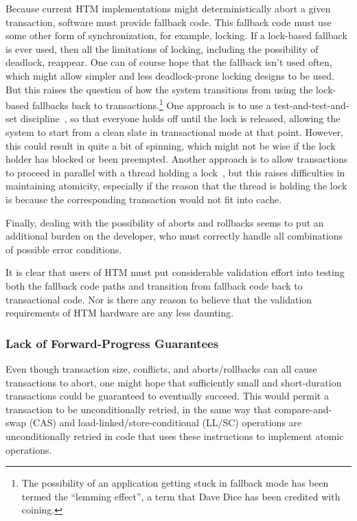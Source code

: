 Because current HTM implementations might deterministically abort a
given transaction, software must provide fallback code.
This fallback code must use some other form of synchronization, for
example, locking.
If a lock-based fallback is ever used, then all the limitations of locking,
including the possibility of deadlock, reappear.
One can of course hope that the fallback isn't used often, which might
allow simpler and less deadlock-prone locking designs to be used.
But this raises the question of how the system transitions from using
the lock-based fallbacks back to transactions.\footnote{
	The possibility of an application getting stuck in fallback
	mode has been termed the ``lemming effect'', a term that
	Dave Dice has been credited with coining.}
One approach is to use a test-and-test-and-set discipline~\cite{Martinez02a},
so that everyone holds off until the lock is released, allowing the
system to start from a clean slate in transactional mode at that point.
However, this could result in quite a bit of spinning, which might not
be wise if the lock holder has blocked or been preempted.
Another approach is to allow transactions to proceed in parallel with
a thread holding a lock~\cite{Martinez02a}, but this raises difficulties
in maintaining atomicity, especially if the reason that the thread is
holding the lock is because the corresponding transaction would not fit
into cache.

Finally, dealing with the possibility of aborts and rollbacks seems to
put an additional burden on the developer, who must correctly handle
all combinations of possible error conditions.

It is clear that users of HTM must put considerable validation effort
into testing both the fallback code paths and transition from fallback
code back to transactional code.
Nor is there any reason to believe that the validation requirements of
HTM hardware are any less daunting.

\subsubsection{Lack of Forward-Progress Guarantees}
\label{sec:future:Lack of Forward-Progress Guarantees}

Even though transaction size, conflicts, and aborts/rollbacks can all
cause transactions to abort, one might hope that sufficiently small and
short-duration transactions could be guaranteed to eventually succeed.
This would permit a transaction to be unconditionally retried, in the
same way that compare-and-swap (CAS) and load-linked/store-conditional
(LL/SC) operations are unconditionally retried in code that uses these
instructions to implement atomic operations.

